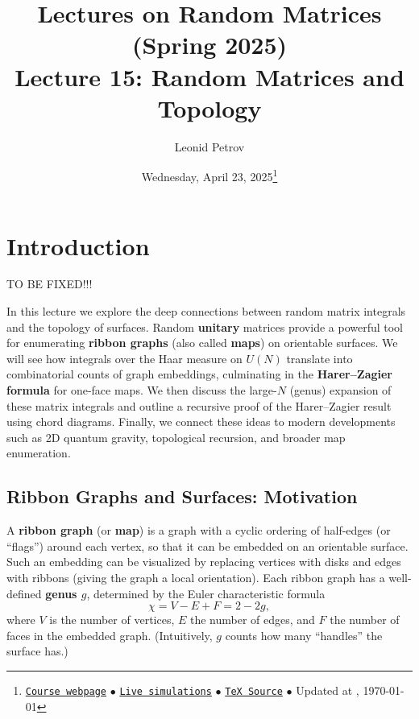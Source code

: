 \documentclass[letterpaper,11pt,oneside,reqno]{article}
\numberwithin{equation}{section}
\theoremstyle{definition}
\begin{document}
\title{Lectures on Random Matrices
(Spring 2025)
\\Lecture 15: Random Matrices and Topology}


\date{Wednesday, April 23, 2025\footnote{\href{https://lpetrov.cc/rmt25/}{\texttt{Course webpage}}
$\bullet$ \href{https://lpetrov.cc/simulations/model/random-matrices/}{\texttt{Live simulations}}
$\bullet$ \href{https://lpetrov.cc/rmt25/rmt25-notes/rmt2025-l15.tex}{\texttt{TeX Source}}
$\bullet$
Updated at \currenttime, \today}}



\author{Leonid Petrov}


\maketitle
\tableofcontents



\section{Introduction}


TO BE FIXED!!!


In this lecture we explore the deep connections between random matrix integrals and the topology of surfaces. Random \textbf{unitary} matrices provide a powerful tool for enumerating \textbf{ribbon graphs} (also called \textbf{maps}) on orientable surfaces. We will see how integrals over the Haar measure on $U(N)$ translate into combinatorial counts of graph embeddings, culminating in the \textbf{Harer–Zagier formula} for one-face maps. We then discuss the large-$N$ (genus) expansion of these matrix integrals and outline a recursive proof of the Harer–Zagier result using chord diagrams. Finally, we connect these ideas to modern developments such as 2D quantum gravity, topological recursion, and broader map enumeration.

\subsection*{Ribbon Graphs and Surfaces: Motivation}

A \textbf{ribbon graph} (or \textbf{map}) is a graph with a cyclic ordering of half-edges (or ``flags'') around each vertex, so that it can be embedded on an orientable surface. Such an embedding can be visualized by replacing vertices with disks and edges with ribbons (giving the graph a local orientation). Each ribbon graph has a well-defined \textbf{genus $g$}, determined by the Euler characteristic formula
\[ \chi = V - E + F = 2 - 2g, \]
where $V$ is the number of vertices, $E$ the number of edges, and $F$ the number of faces in the embedded graph. (Intuitively, $g$ counts how many ``handles'' the surface has.)
\end{document}
